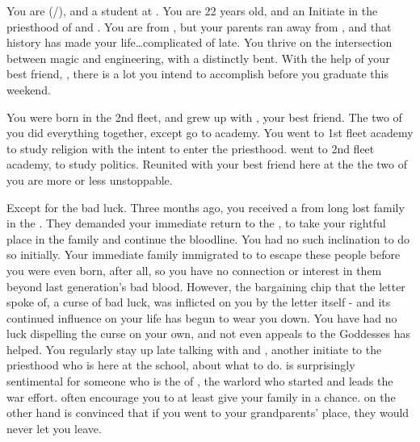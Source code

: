 \documentclass[char]{GL2020}
\begin{document}
\name{\cInitiate{}}



You are \cInitiate{\full} (\cInitiate{\they}/\cInitiate{\them}), and a student at \pSchool{}. You are 22 years old, and an Initiate in the priesthood of \cEbb{} and \cFlow{}. You are from \pShip{}, but your parents ran away from \pFarm{}, and that history has made your life\ldots complicated of late. You thrive on the intersection between magic and engineering, with a distinctly \pShip{} bent. With the help of your best friend, \cPresident{\full}, there is a lot you intend to accomplish before you graduate this weekend.

You were born in the 2nd fleet, and grew up with \cPresident{}, your best friend. The two of you did everything together, except go to academy. You went to 1st fleet academy to study religion with the intent to enter the priesthood. \cPresident{\They} went to 2nd fleet academy, to study politics. Reunited with your best friend here at the \pSchool{} the two of you are more or less unstoppable. 

Except for the bad luck. Three months ago, you received a \iCursedLetter{} from long lost family in the \pFarm{}. They demanded your immediate return to the \pFarm{}, to take your rightful place in the family and continue the bloodline. You had no such inclination to do so initially. Your immediate family immigrated to \pShip{} to escape these people before you were even born, after all, so you have no connection or interest in them beyond last generation’s bad blood. However, the bargaining chip that the letter spoke of, a curse of bad luck, was inflicted on you by the letter itself - and its continued influence on your life has begun to wear you down. You have had no luck dispelling the curse on your own, and not even appeals to the Goddesses has helped. You regularly stay up late talking with \cPresident{} and \cWarlordDaughter{}, another initiate to the priesthood who is here at the school, about what to do. \cWarlordDaughter{} is surprisingly sentimental for someone who is the \cWarlordDaughter{\child} of \cLoud{\full}, the warlord who started and leads the \pShip{} war effort. \cWarlordDaughter{\They} often encourage\cWarlordDaughter{\plural} you to at least give your family in \pFarm{} a chance. \cPresident{} on the other hand is convinced that if you went to your grandparents' place, they would never let you leave.
\end{document}
